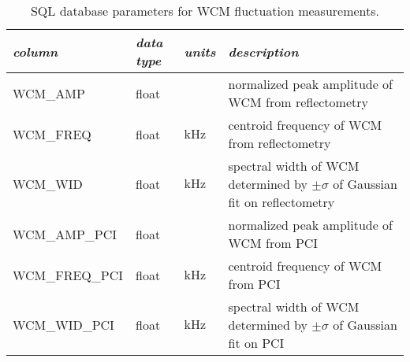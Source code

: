  \begin{longtabu} to 150mm {X[2.348,l]X[1,c]X[1,c]X[4.348,c]}
 \caption{SQL database parameters for WCM fluctuation measurements.}\label{tab:sql_fluct} \\

 \toprule
 \emph{column} &
 \emph{data type} &
 \emph{units} &
 \emph{description}
 \\
 \midrule
 \endfirsthead
 \endhead

 \endfoot
 \bottomrule
 \endlastfoot

 WCM\_AMP &
 float &
 &
 normalized peak amplitude of WCM from reflectometry
 \\
 WCM\_FREQ &
 float &
 $\si{\kilo\hertz}$ &
 centroid frequency of WCM from reflectometry
 \\
 WCM\_WID &
 float &
 $\si{\kilo\hertz}$ &
 spectral width of WCM determined by $\pm\sigma$ of Gaussian fit on reflectometry
 \\
 WCM\_AMP\_PCI &
 float &
 &
 normalized peak amplitude of WCM from PCI
 \\
 WCM\_FREQ\_PCI &
 float &
 $\si{\kilo\hertz}$ &
 centroid frequency of WCM from PCI
 \\
 WCM\_WID\_PCI &
 float &
 $\si{\kilo\hertz}$ &
 spectral width of WCM determined by $\pm\sigma$ of Gaussian fit on PCI
 \\
  
 \end{longtabu}

\restoregeometry

\nicechapterending